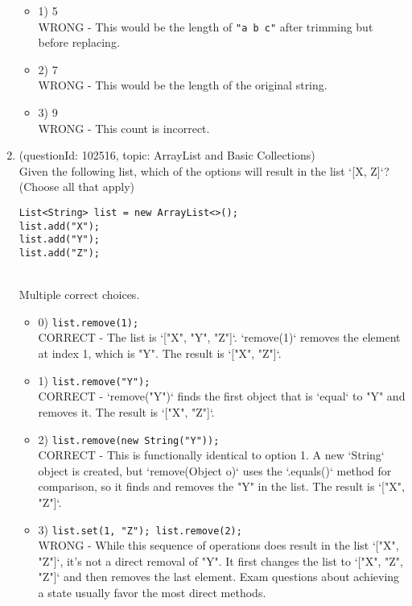 \documentclass[12pt]{article}
\begin{document}
\begin{enumerate}[label=(\arabic*)]
\begin{itemize}
\item 1) 5
 \\ 
WRONG - This would be the length of \verb|"a b c"| after trimming but before replacing.

\item 2) 7
 \\ 
WRONG - This would be the length of the original string.

\item 3) 9
 \\ 
WRONG - This count is incorrect.

\end{itemize}
\item (questionId: 102516, topic: ArrayList and Basic Collections) \\ 
Given the following list, which of the options will result in the list `[X, Z]`? (Choose all that apply)\begin{verbatim}
List<String> list = new ArrayList<>();
list.add("X");
list.add("Y");
list.add("Z");
\end{verbatim}
\\ \noindent Multiple correct choices. 
\begin{itemize}
\item 0) \verb|list.remove(1);|
 \\ 
CORRECT - The list is `["X", "Y", "Z"]`. `remove(1)` removes the element at index 1, which is "Y". The result is `["X", "Z"]`.

\item 1) \verb|list.remove("Y");|
 \\ 
CORRECT - `remove("Y")` finds the first object that is `equal` to "Y" and removes it. The result is `["X", "Z"]`.

\item 2) \verb|list.remove(new String("Y"));|
 \\ 
CORRECT - This is functionally identical to option 1. A new `String` object is created, but `remove(Object o)` uses the `.equals()` method for comparison, so it finds and removes the "Y" in the list. The result is `["X", "Z"]`.

\item 3) \verb|list.set(1, "Z"); list.remove(2);|
 \\ 
WRONG - While this sequence of operations does result in the list `["X", "Z"]`, it's not a direct removal of "Y". It first changes the list to `["X", "Z", "Z"]` and then removes the last element. Exam questions about achieving a state usually favor the most direct methods.


\end{itemize}
\end{enumerate}
\end{document}
